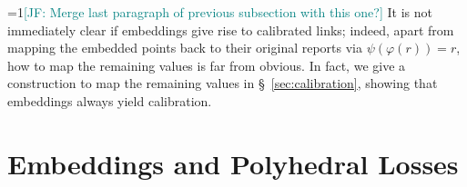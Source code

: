 \documentclass[11pt]{article}
\newcommand{\Comments}{1}
\newcommand{\mynote}[2]{\ifnum\Comments=1\textcolor{#1}{#2}\fi}
\newcommand{\raf}[1]{\mynote{darkgreen}{[RF: #1]}}
\newcommand{\jessie}[1]{\mynote{teal}{[JF: #1]}}
\newcommand{\bo}[1]{\mynote{blue}{[Bo: #1]}}
\newcommand{\simplex}{\Delta_\Y}
\newcommand{\R}{\mathcal{R}}
\newcommand{\Y}{\mathcal{Y}}
\newcommand{\inprod}[2]{\langle #1, #2 \rangle}%
\newcommand{\ellzo}{\ell_{\text{0-1}}}
\DeclareMathOperator*{\argmax}{arg\,max}
\begin{document}
\jessie{Merge last paragraph of previous subsection with this one?}
It is not immediately clear if embeddings give rise to calibrated links; indeed, apart from mapping the embedded points back to their original reports via $\psi(\varphi(r)) = r$, how to map the remaining values is far from obvious.
In fact, we give a construction to map the remaining values in \S~\ref{sec:calibration}, showing that embeddings always yield calibration.














\section{Embeddings and Polyhedral Losses}
\label{sec:poly-loss-embed}
\end{document}
